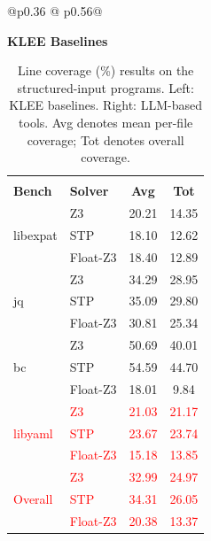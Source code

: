 \documentclass[acmsmall,screen,nonacm]{acmart}
\newcommand{\rev}[1]{\textcolor{red}{#1}}
\newcommand{\rev}[1]{#1}
\theoremstyle{definition}
\begin{document}
\begin{table}[ht!]
\centering
\caption{Line coverage (\%) results on the structured-input programs.
Left: KLEE baselines.
Right: LLM-based tools.
Avg denotes mean per-file coverage; Tot denotes overall coverage.}
\label{tab:coverage-summary}
\footnotesize
\vspace{-4mm}
\hspace*{-8mm}\begin{tabular}{@{}p{}
@{\hspace{0.00\columnwidth}}
p{}@{}}

\raggedright
\centering\textbf{KLEE Baselines}\par\vspace{2pt}
\centering
\begin{tabular}{|l|lcc|}
\toprule
\multicolumn{4}{|c|}{\rule{0pt}{3.2ex}} \\  %
\textbf{Bench} & \textbf{Solver} & \textbf{Avg} & \textbf{Tot} \\
\midrule
\multirow{3}{*}{libexpat}
 & Z3        & 20.21 & 14.35 \\
 & STP       & 18.10 & 12.62 \\
 & Float-Z3  & 18.40 & 12.89 \\
\midrule
\multirow{3}{*}{jq}
 & Z3        & 34.29 & 28.95 \\
 & STP       & 35.09 & 29.80 \\
 & Float-Z3  & 30.81 & 25.34 \\
\midrule
\multirow{3}{*}{bc}
 & Z3        & 50.69 & 40.01 \\
 & STP       & 54.59 & 44.70 \\
 & Float-Z3  & 18.01 & 9.84 \\
  
 \midrule

\multirow{3}{*}{\rev{libyaml}}
 & \rev{Z3}        & \rev{21.03} & \rev{21.17} \\
 & \rev{STP}       & \rev{23.67} & \rev{23.74} \\
 & \rev{Float-Z3}  & \rev{15.18} & \rev{13.85} \\
\midrule
\midrule
\multirow{3}{*}{\rev{Overall}}
& \rev{Z3}        & \rev{32.99} & \rev{24.97} \\
& \rev{STP}       & \rev{34.31} & \rev{26.05} \\
& \rev{Float-Z3}  & \rev{20.38} & \rev{13.37} \\


\end{tabular}
\end{tabular}
\end{table}
\end{document}
